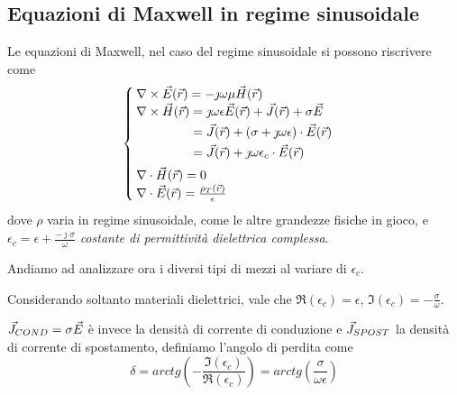 \subsection{Equazioni di Maxwell in regime sinusoidale}
Le equazioni di Maxwell, nel caso del regime sinusoidale si possono riscrivere come
\begin{equation}\begin{cases}
  \nabla\times\vec{E}(\vec{r}) = -\jmath \omega \mu\vec{H}(\vec{r}) \\
	\begin{aligned}[b]
		\nabla\times\vec{H}(\vec{r}) &= \jmath  \omega \epsilon \vec{E}(\vec{r}) + \vec{J}(\vec{r}) + \sigma\vec{E} \\
		&= \vec{J}(\vec{r}) +(\sigma + \jmath \omega \epsilon) \cdot \vec{E}(\vec{r}) \\
		&= \vec{J}(\vec{r}) +\jmath \omega \epsilon_c \cdot \vec{E}(\vec{r}) \\
	\end{aligned} \\
  \nabla\cdot\vec{H}(\vec{r})=0\\
  \nabla\cdot \vec{E}(\vec{r}) = \frac{\rho_T(\vec{r})}{\epsilon}
\end{cases}\end{equation}
dove $\rho$ varia in regime sinusoidale, come le altre grandezze fisiche in gioco, e $\epsilon_c = \epsilon + \frac{-\jmath\sigma}{\omega}$ \emph{costante di permittività dielettrica complessa}.

Andiamo ad analizzare ora i diversi tipi di mezzi al variare di $\epsilon_c$.

\begin{definition}
	Considerando soltanto materiali dielettrici, vale che $\Re(\epsilon_c) = \epsilon$, $\Im(\epsilon_c) = -\frac{\sigma}{\omega}$.

	$\vec{J}_{COND} = \sigma \vec{E}$ è invece la densità di corrente di conduzione e $\vec{J}_{SPOST}$ la densità di corrente di spostamento, definiamo l'angolo di perdita come
  \begin{equation}
    \delta = arctg\left(-\frac{\Im(\epsilon_c)}{\Re(\epsilon_c)}\right) = arctg\left(\frac{\sigma}{\omega \epsilon}\right)
    \end{equation}
\end{definition}


